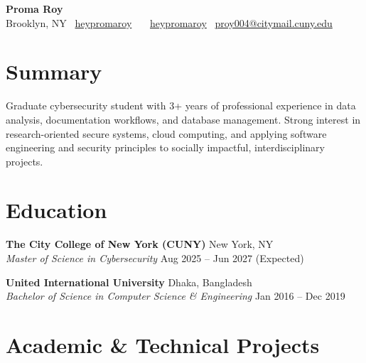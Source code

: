 \documentclass[10pt]{article}
\begin{document}
{\LARGE \textbf{Proma Roy}}\\[-2pt]
Brooklyn, NY \hfill
\faGithub\ \href{https://github.com/heypromaroy}{heypromaroy} \ \ 
\faLinkedin\ \href{https://www.linkedin.com/in/heypromaroy}{heypromaroy}
\faEnvelope\ \href{mailto:proy004@citymail.cuny.edu}{proy004@citymail.cuny.edu}
\vspace{2pt}

\section*{Summary}
Graduate cybersecurity student with 3+ years of professional experience in data analysis, documentation workflows, and database management. Strong interest in research-oriented secure systems, cloud computing, and applying software engineering and security principles to socially impactful, interdisciplinary projects.

\section*{Education}

\textbf{The City College of New York (CUNY)} \hfill New York, NY\\
\textit{Master of Science in Cybersecurity} \hfill Aug 2025 -- Jun 2027 (Expected)

\textbf{United International University} \hfill Dhaka, Bangladesh\\
\textit{Bachelor of Science in Computer Science \& Engineering} \hfill Jan 2016 -- Dec 2019

\section*{Academic \& Technical Projects}
\end{document}
